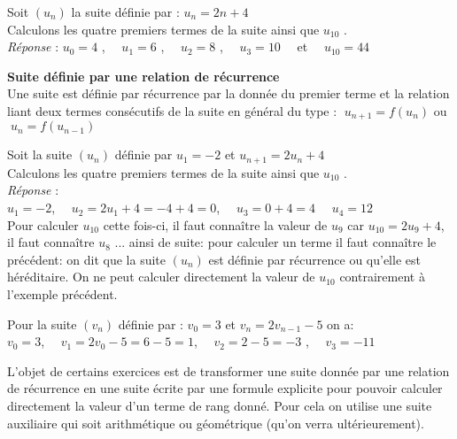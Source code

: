 \begin{example}

Soit $ (u_{n}) $ la suite définie par :  $ u_{n} = 2n + 4 $ \\
 Calculons les quatre premiers termes de la suite ainsi que $ u_{10} $ .\\
 \textsl{Réponse} :
 $ u_{0}=  4 $ , $\quad u_{1} =  6 $ , $\quad u_{2} =  8 $ ,  $ \quad u_{3}=  10 \quad$ et  $ \quad u_{10} =  44 $
  \end{example}
 \textbf{Suite définie  par une relation de récurrence}\\
 Une suite est  définie par  récurrence  par la donnée du premier terme et la relation liant deux termes consécutifs de la suite en général du type : $\;  u_{n+1} = f(u_{n}) $ ou $ \; u_{n} = f(u_{n-1}) $
     
     \begin{example}
     
     Soit la suite $ (u_{n})$ définie par $ u_{1}=-2 $ et $ u_{n+1} = 2u_{n}+4 $\\
Calculons les quatre premiers termes de la suite ainsi que $ u_{10} $ .\\
  \textsl{Réponse }: \\
  $ u_{1}=  -2 $,  $\quad u_{2}= 2u_{1}+4= -4+4=0 $, $\quad     u_{3} =  0+4= 4 $  $ \quad u_{4} =  12 $ \\
  Pour calculer  $ u_{10} $ cette fois-ci, il faut connaître la valeur de  $ u_{9} $ car $ u_{10}=2u_{9}+4 $, il faut connaître $ u_{8} $ ... ainsi de suite: pour calculer un terme il faut connaître le précédent: on dit que la suite  $ (u_{n})$ est définie par récurrence ou qu'elle est héréditaire. On ne peut calculer directement la valeur de  $ u_{10} $ contrairement à l'exemple précédent.
  \end{example}

\begin{example} 
Pour la suite $ (v_{n})$ définie par : \; $v_{0}=3 $  et  $ v_{n}= 2v_{n-1}-5 $  on a:\\
  $ v_{0}=  3 $,  $\quad v_{1}= 2v_{0}-5= 6-5=1 $, $\quad v_{2} =  2-5= -3 $ , $\quad v_{3} =  -11 $ 
 \end{example}
 L'objet de certains exercices est de transformer une suite  donnée par une relation de récurrence  en une suite écrite par une formule explicite pour pouvoir calculer directement la valeur d'un terme de rang donné. Pour cela on utilise une  suite auxiliaire qui soit arithmétique ou géométrique (qu'on verra ultérieurement). 
  

